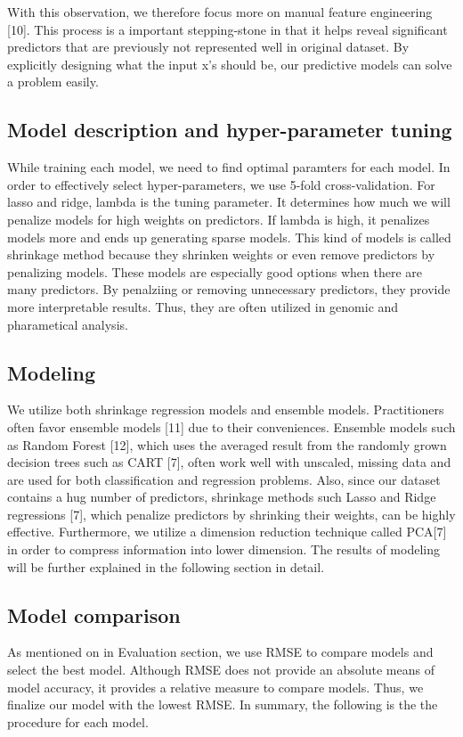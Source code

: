 \documentclass[letterpaper, 10 pt, conference]{ieeeconf}\usepackage[]{graphicx}\usepackage[]{color}
\begin{document}
With this observation, we therefore focus more on manual feature engineering [10]. This process is a important stepping-stone in that it helps reveal significant predictors that are previously not represented well in original dataset. By explicitly designing what the input x's should be, our predictive models can solve a problem easily. 

\subsection{Model description and hyper-parameter tuning}
While training each model, we need to find optimal paramters for each model. In order to effectively select hyper-parameters, we use 5-fold cross-validation. For lasso and ridge, lambda is the tuning parameter. It determines how much we will penalize models for high weights on predictors. If lambda is high, it penalizes models more and ends up generating sparse models. This kind of models is called shrinkage method because they shrinken weights or even remove predictors by penalizing models. These models are especially good options when there are many predictors. By penalziing or removing unnecessary predictors, they provide more interpretable results. Thus, they are often utilized in genomic and pharametical analysis.

\subsection{Modeling}
We utilize both shrinkage regression models and ensemble models. Practitioners often favor ensemble models [11] due to their conveniences. Ensemble models such as Random Forest [12], which uses the averaged result from the randomly grown decision trees such as CART [7], often work well with unscaled, missing data and are used for both classification and regression problems. Also, since our dataset contains a hug number of predictors, shrinkage methods such Lasso and Ridge regressions [7], which penalize predictors by shrinking their weights, can be highly effective. Furthermore, we utilize a dimension reduction technique called PCA[7] in order to compress information into lower dimension. The results of modeling will be further explained in the following section in detail.

\subsection{Model comparison}
As mentioned on in Evaluation section, we use RMSE to compare models and select the best model. Although RMSE does not provide an absolute means of model accuracy, it provides a relative measure to compare models. Thus, we finalize our model with the lowest RMSE.
In summary, the following is the the procedure for each model.
\end{document}
